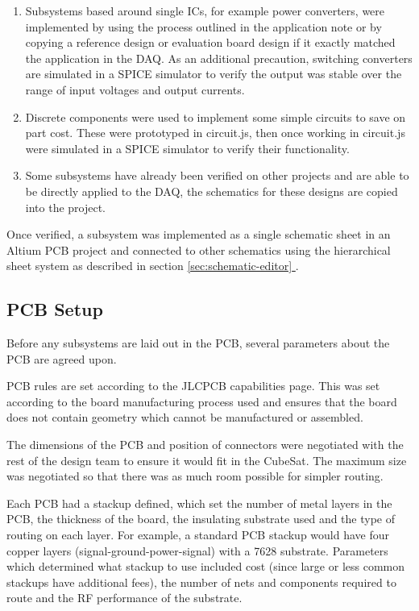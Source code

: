 \documentclass{report}
\newcommand*{\secref}[1]{section \hyperref[{#1}]{\ref*{#1} \nameref*{#1}}}
\begin{document}
\begin{enumerate}
  \item Subsystems based around single ICs, for example power converters, were implemented by using the process outlined in the application note or by copying a reference design or evaluation board design if it exactly matched the application in the DAQ. As an additional precaution, switching converters are simulated in a SPICE simulator to verify the output was stable over the range of input voltages and output currents.
  \item Discrete components were used to implement some simple circuits to save on part cost. These were prototyped in circuit.js, then once working in circuit.js were simulated in a SPICE simulator to verify their functionality.
  \item Some subsystems have already been verified on other projects and are able to be directly applied to the DAQ, the schematics for these designs are copied into the project.
\end{enumerate}

Once verified, a subsystem was implemented as a single schematic sheet in an Altium PCB project and connected to other schematics using the hierarchical sheet system as described in \secref{sec:schematic-editor}.

\subsection{PCB Setup}

Before any subsystems are laid out in the PCB, several parameters about the PCB are agreed upon.

PCB rules are set according to the JLCPCB capabilities page. This was set according to the board manufacturing process used and ensures that the board does not contain geometry which cannot be manufactured or assembled.

The dimensions of the PCB and position of connectors were negotiated with the rest of the design team to ensure it would fit in the CubeSat. The maximum size was negotiated so that there was as much room possible for simpler routing.

Each PCB had a stackup defined, which set the number of metal layers in the PCB, the thickness of the board, the insulating substrate used and the type of routing on each layer. For example, a standard PCB stackup would have four copper layers (signal-ground-power-signal) with a 7628 substrate. Parameters which determined what stackup to use included cost (since large or less common stackups have additional fees), the number of nets and components required to route and the RF performance of the substrate.
\end{document}
